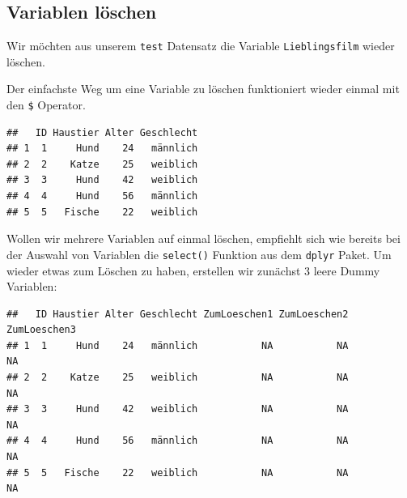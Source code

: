 \documentclass[
]{book}
\newenvironment{Shaded}{\begin{snugshade}}{\end{snugshade}}
\newcommand{\ConstantTok}[1]{\textcolor[rgb]{0.00,0.00,0.00}{#1}}
\newcommand{\NormalTok}[1]{#1}
\newcommand{\OtherTok}[1]{\textcolor[rgb]{0.56,0.35,0.01}{#1}}
\newcommand{\SpecialCharTok}[1]{\textcolor[rgb]{0.00,0.00,0.00}{#1}}
\begin{document}
\hypertarget{variablen-luxf6schen}{%
\subsection{Variablen löschen}\label{variablen-luxf6schen}}

Wir möchten aus unserem \texttt{test} Datensatz die Variable \texttt{Lieblingsfilm} wieder löschen.

Der einfachste Weg um eine Variable zu löschen funktioniert wieder einmal mit den \texttt{\$} Operator.

\begin{Shaded}
\end{Shaded}

\begin{verbatim}
##   ID Haustier Alter Geschlecht
## 1  1     Hund    24   männlich
## 2  2    Katze    25   weiblich
## 3  3     Hund    42   weiblich
## 4  4     Hund    56   männlich
## 5  5   Fische    22   weiblich
\end{verbatim}

Wollen wir mehrere Variablen auf einmal löschen, empfiehlt sich wie bereits bei der Auswahl von Variablen die \texttt{select()} Funktion aus dem \texttt{dplyr} Paket. Um wieder etwas zum Löschen zu haben, erstellen wir zunächst 3 leere Dummy Variablen:

\begin{Shaded}
\end{Shaded}

\begin{verbatim}
##   ID Haustier Alter Geschlecht ZumLoeschen1 ZumLoeschen2 ZumLoeschen3
## 1  1     Hund    24   männlich           NA           NA           NA
## 2  2    Katze    25   weiblich           NA           NA           NA
## 3  3     Hund    42   weiblich           NA           NA           NA
## 4  4     Hund    56   männlich           NA           NA           NA
## 5  5   Fische    22   weiblich           NA           NA           NA
\end{verbatim}
\end{document}
